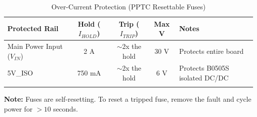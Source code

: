 \documentclass[10pt]{datasheet}
\begin{document}
\begin{table}[H]
\caption{Over-Current Protection (PPTC Resettable Fuses)}
\begin{tabularx}{\textwidth}{l | c | c | c | X}
    \thickhline
    \textbf{Protected Rail} & \textbf{Hold} ($I_{HOLD}$) & \textbf{Trip} ($I_{TRIP}$) & \textbf{Max V} & \textbf{Notes} \\
    \hline
    Main Power Input ($V_{IN}$) & 2 A & $\sim$2x the hold  & 30 V & Protects entire board \\
    5V\_ISO & 750 mA & $\sim$2x the hold & 6 V & Protects B0505S isolated DC/DC \\
    \thickhline
\end{tabularx}
\begin{tablenotes}
\footnotesize
\item \textbf{Note:} Fuses are self-resetting. To reset a tripped fuse, remove the fault and cycle power for $>10$ seconds.
\end{tablenotes}
\end{table}
\end{document}
